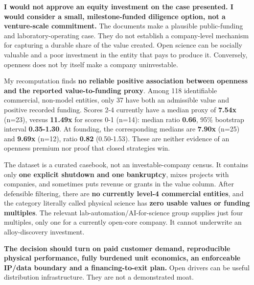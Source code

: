 \textbf{I would not approve an equity investment on the case presented.
I would consider a small, milestone-funded diligence option, not a
venture-scale commitment.} The documents make a plausible public-funding
and laboratory-operating case. They do not establish a company-level
mechanism for capturing a durable share of the value created. Open
science can be socially valuable and a poor investment in the entity
that pays to produce it. Conversely, openness does not by itself make a
company uninvestable.

My recomputation finds \textbf{no reliable positive association between
openness and the reported value-to-funding proxy}. Among 118
identifiable commercial, non-model entities, only 37 have both an
admissible value and positive recorded funding. Scores 2-4 currently
have a median proxy of \textbf{7.54x} (n=23), versus \textbf{11.49x} for
scores 0-1 (n=14): median ratio \textbf{0.66}, 95\% bootstrap interval
\textbf{0.35-1.30}. At founding, the corresponding medians are
\textbf{7.90x} (n=25) and \textbf{9.69x} (n=12), ratio \textbf{0.82}
(0.50-1.53). These are neither evidence of an openness premium nor proof
that closed strategies win.

The dataset is a curated casebook, not an investable-company census. It
contains only \textbf{one explicit shutdown and one bankruptcy}, mixes
projects with companies, and sometimes puts revenue or grants in the
value column. After defensible filtering, there are \textbf{no currently
level-4 commercial entities}, and the category literally called physical
science has \textbf{zero usable values or funding multiples}. The
relevant lab-automation/AI-for-science group supplies just four
multiples, only one for a currently open-core company. It cannot
underwrite an alloy-discovery investment.

\textbf{The decision should turn on paid customer demand, reproducible
physical performance, fully burdened unit economics, an enforceable
IP/data boundary and a financing-to-exit plan.} Open drivers can be
useful distribution infrastructure. They are not a demonstrated moat.
